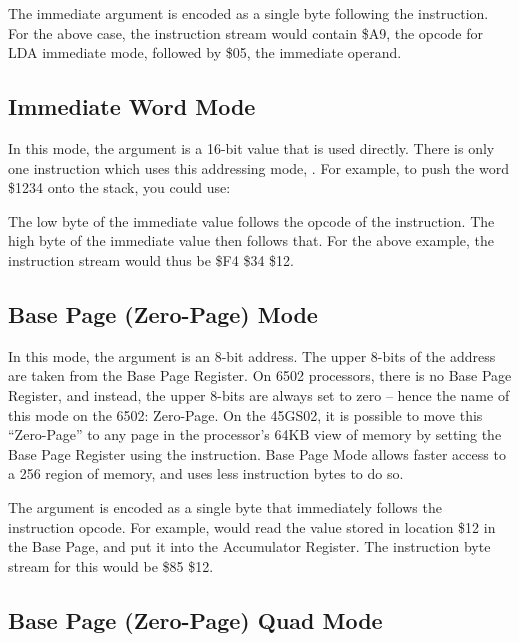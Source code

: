 
The immediate argument is encoded as a single byte following the instruction.  For the above
case, the instruction stream would contain \$A9, the opcode for LDA immediate mode, followed
by \$05, the immediate operand.

\subsection{Immediate Word Mode}

In this mode, the argument is a 16-bit value that is used directly. There is only one instruction
which uses this addressing mode, .  For example, to push the word \$1234
onto the stack, you could use:


The low byte of the immediate value follows the opcode of the instruction.  The high byte of the
immediate value then follows that.  For the above example, the instruction stream would thus
be \$F4 \$34 \$12.

\subsection{Base Page (Zero-Page) Mode}

In this mode, the argument is an 8-bit address.  The upper 8-bits of the address are taken from
the Base Page Register.  On 6502 processors, there is no Base Page Register, and instead, the
upper 8-bits are always set to zero -- hence the name of this mode on the 6502: Zero-Page. On
the 45GS02, it is possible to move this ``Zero-Page'' to any page in the processor's 64KB view
of memory by setting the Base Page Register using the  instruction. Base Page
Mode allows faster access to a 256 region of memory, and uses less instruction bytes to do so.

The argument is encoded as a single byte that immediately follows the instruction opcode. For
example,  would read the value stored in location \$12 in the Base Page,
and put it into the Accumulator Register.  The instruction byte stream for this would be
\$85 \$12.

\subsection{Base Page (Zero-Page) Quad Mode}

